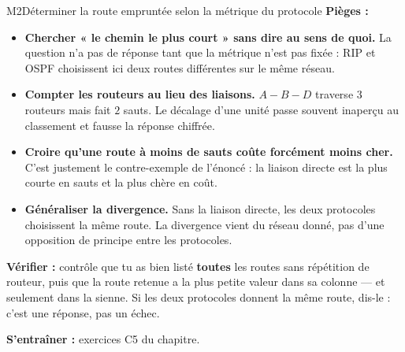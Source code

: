 \begin{fichemethode}{M2}{Déterminer la route empruntée selon la métrique du protocole}
\textbf{Pièges :}
\begin{itemize}
  \item \textbf{Chercher « le chemin le plus court » sans dire au sens de quoi.} La question
    n'a pas de réponse tant que la métrique n'est pas fixée : RIP et OSPF choisissent ici deux
    routes différentes sur le même réseau.
  \item \textbf{Compter les routeurs au lieu des liaisons.} $A\!-\!B\!-\!D$ traverse $3$
    routeurs mais fait $2$ sauts. Le décalage d'une unité passe souvent inaperçu au classement
    et fausse la réponse chiffrée.
  \item \textbf{Croire qu'une route à moins de sauts coûte forcément moins cher.} C'est
    justement le contre-exemple de l'énoncé : la liaison directe est la plus courte en sauts
    et la plus chère en coût.
  \item \textbf{Généraliser la divergence.} Sans la liaison directe, les deux protocoles
    choisissent la même route. La divergence vient du réseau donné, pas d'une opposition de
    principe entre les protocoles.
\end{itemize}

\textbf{Vérifier :} contrôle que tu as bien listé \textbf{toutes} les routes sans répétition de
routeur, puis que la route retenue a la plus petite valeur dans sa colonne — et seulement dans
la sienne. Si les deux protocoles donnent la même route, dis-le : c'est une réponse, pas un
échec.

\textbf{S'entraîner :} exercices C5 du chapitre.
\end{fichemethode}
